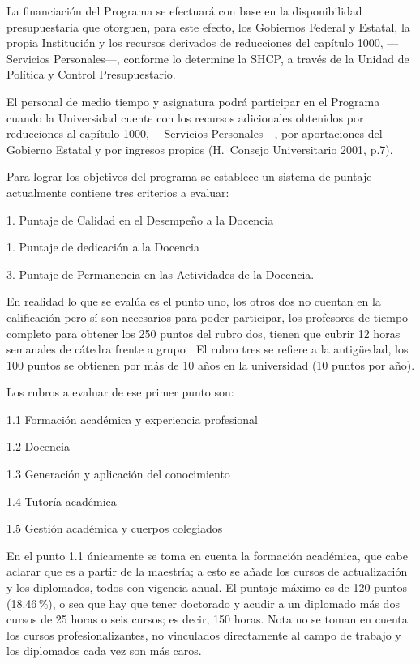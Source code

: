 La financiación del Programa se efectuará con base en la disponibilidad
presupuestaria que otorguen, para este efecto, los Gobiernos Federal y
Estatal, la propia Institución y los recursos derivados de reducciones del
capítulo 1000, ---Servicios Personales---, conforme lo determine la SHCP, a
través de la Unidad de Política y Control Presupuestario. 


El personal de medio tiempo y asignatura podrá participar en el Programa
cuando la Universidad cuente con los recursos adicionales obtenidos por
reducciones al capítulo 1000, ---Servicios Personales---, por aportaciones del
Gobierno Estatal y por ingresos propios (H.\ Consejo Universitario 2001,
p.7). 


Para lograr los objetivos del programa se establece un sistema de puntaje
actualmente contiene tres criterios a evaluar:

\begin{Obs}
\item[1.] Puntaje de Calidad en el Desempeño a la Docencia
\item[1.] Puntaje de dedicación a la Docencia
\item[3.] Puntaje de Permanencia en las Actividades de la Docencia.
\end{Obs}

En realidad lo que se evalúa es el punto uno, los otros dos no cuentan en la
calificación pero  sí son necesarios para poder participar, los profesores
de tiempo completo para obtener los 250 puntos del rubro dos, tienen que
cubrir 12 horas semanales de cátedra frente a grupo . El rubro tres se
refiere a la antigüedad, los 100 puntos se obtienen por más de 10 años en
la universidad (10 puntos por año). 


Los rubros a evaluar de ese primer punto son:

\begin{Obs}
\item[1.1] Formación académica y experiencia profesional
\item[1.2] Docencia
\item[1.3] Generación y aplicación del conocimiento
\item[1.4] Tutoría académica
\item[1.5] Gestión académica y cuerpos colegiados
\end{Obs}


En el punto 1.1 únicamente se toma en cuenta la formación académica, que
cabe aclarar que es a partir de la maestría; a esto se añade los cursos de
actualización y los diplomados, todos con vigencia anual. El puntaje máximo
es de 120 puntos (18.46\,\%), o sea que hay que tener doctorado y  acudir a
un diplomado  más dos cursos de 25 horas o seis cursos; es decir, 150 horas.
Nota no se toman en cuenta  los cursos profesionalizantes, no vinculados
directamente al campo de trabajo  y los diplomados cada vez son más caros.


